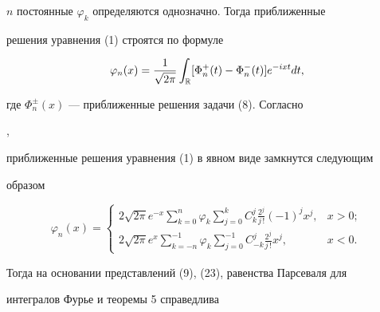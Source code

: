 $n$ постоянные $\varphi_k$ определяются однозначно. Тогда приближенные 


решения уравнения (1) строятся по формуле 


\begin{equation} 


\varphi_n(x)=\frac{1}{\sqrt{2\pi}}\int_{\Bbb R} 


[\Phi^+_n(t)-\Phi^-_n(t)]e^{-ixt}dt, 


\end{equation} 


где $\Phi^\pm_n(x)$ --- приближенные решения задачи (8). Согласно 


\cite{7}, \cite{6} 


приближенные решения уравнения (1) в явном виде замкнутся следующим 


образом 


\begin{equation} 


\varphi_n(x)= 


\begin{cases} 


\displaystyle 2\sqrt{2\pi}e^{-x}\sum^n_{k=0}\varphi_k 


\sum^k_{j=0}C^j_k\frac{2^j}{j\,!}(-1)^j x^j, & x>0;\\[2mm] 


\displaystyle 2\sqrt{2\pi}e^x\sum^{-1}_{k=-n}\varphi_k 


\sum^{-1}_{j=0}C^j_{-k}\frac{2^j}{j\,!}x^j, &x<0. 


\end{cases} 


\end{equation} 


Тогда на основании представлений (9), (23), равенства Парсеваля для 


интегралов Фурье \cite{7} и теоремы 5 справедлива 


 


